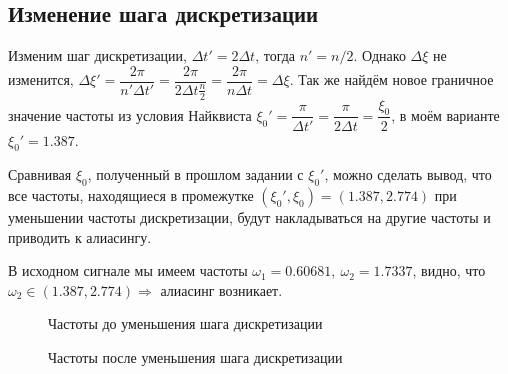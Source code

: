 \documentclass[12pt, a4paper]{article}
\begin{document}
\subsection*{Изменение шага дискретизации}

Изменим шаг дискретизации, $\Delta t' = 2 \Delta t$, тогда $n' = n/2$. Однако $\Delta \xi$ не изменится, $\Delta \xi' = \dfrac{2\pi}{n'\Delta t'} = \dfrac{2\pi}{2\Delta t \frac{n}{2}} = \dfrac{2\pi}{n\Delta t} = \Delta \xi$. 
Так же найдём новое граничное значение частоты из условия Найквиста $\xi_0' = \dfrac{\pi}{\Delta t'} = \dfrac{\pi}{2\Delta t} = \dfrac{\xi_0}{2}$, в моём варианте $\xi_0' = 1.387$.

Сравнивая $\xi_0$, полученный в прошлом задании с $\xi_0'$, можно сделать вывод, что все частоты, находящиеся в промежутке $(\xi_0',\xi_0) = (1.387, 2.774)$ при уменьшении частоты дискретизации, будут накладываться на другие частоты и приводить к алиасингу. 

В исходном сигнале мы имеем частоты $\omega_1 = 0.60681, \: \omega_2 = 1.7337$, видно, что $\omega_2 \in (1.387, 2.774) \Rightarrow$ алиасинг возникает.

\begin{figure}[h]
\begin{minipage}{0.45\textwidth}
    \caption{\label{graph:6}Частоты до уменьшения шага дискретизации}
\end{minipage} \hfill
\begin{minipage}{0.45\textwidth}
    \caption{\label{graph:7}Частоты после уменьшения шага дискретизации}
\end{minipage}
\end{figure}
\end{document}
